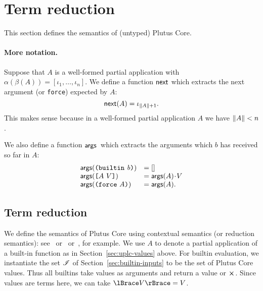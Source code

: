 \section{Term reduction}
\label{sec:reduction}

This section defines the semantics of (untyped) Plutus Core.




\paragraph{More notation.} Suppose that $A$ is a well-formed partial application with
$\alpha(\beta(A)) = [\iota_1,\ldots,\iota_n]$.  We define a function $\operatorname{\mathsf{next}}$
which extracts the next argument (or \texttt{force}) expected by $A$:
$$
    \operatorname{\mathsf{next}}(A) = \iota_{\lVert A \rVert+1}.
$$
\noindent%
This makes sense because in a well-formed partial application $A$ we have
$\lVert A \rVert < n$.

\medskip
\noindent We also define a function $\operatorname{\mathbf{\mathsf{args}}}{}$ which extracts the arguments which
$b$ has received so far in $A$:
$$
\begin{array}{ll}
  \operatorname{\mathbf{\mathsf{args}}}(\texttt{(} \texttt{builtin} ~ \mathit{b} \texttt{)}) &= []\\
  \operatorname{\mathbf{\mathsf{args}}}(\texttt{[} A ~ V \texttt{]}) &= \operatorname{\mathbf{\mathsf{args}}}(A)\mathbin{\!\cdot\!} V\\
  \operatorname{\mathbf{\mathsf{args}}}(\texttt{(} \texttt{force} ~ A \texttt{)})   &= \operatorname{\mathbf{\mathsf{args}}}(A).\\
\end{array}
$$%

\subsection{Term reduction}


We define the semantics of Plutus Core using contextual semantics (or reduction
semantics): see~\cite{Felleisen-Hieb} or~\cite{Felleisen-Semantics-Engineering}
or~\cite[5.3]{Harper:PFPL}, for example.  We use $A$ to denote a partial
application of a built-in function as in Section~\ref{sec:uplc-values} above.
For builtin evaluation, we instantiate the set $\mathscr{I}$ of
Section~\ref{sec:builtin-inputs} to be the set of Plutus Core values.  Thus all
builtins take values as arguments and return a value or $\errorX$.  Since values
are terms here, we can take $\reify{V} = V$.

